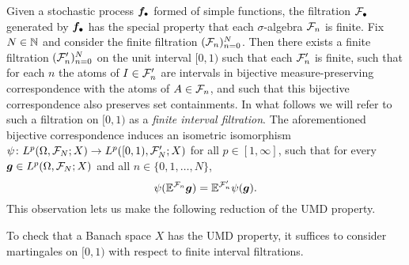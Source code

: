Given a stochastic process $\bm{f}_{\bullet}$ formed of simple functions, the filtration $\mathcal{F}_{\bullet}$ generated by $\bm{f}_{\bullet}$ has the special property that each $\sigma$-algebra $\mathcal{F}_{n}$ is finite.
Fix $N \in \mathbb{N}$ and consider the finite filtration $(\mathcal{F}_{n})_{n=0}^{N}$.
Then there exists a finite filtration $(\mathcal{F}_{n}')_{n=0}^{N}$ on the unit interval $[0,1)$ such that each $\mathcal{F}_{n}'$ is finite, such that for each $n$ the atoms of $I \in \mathcal{F}_{n}'$ are intervals in bijective measure-preserving correspondence with the atoms of $A \in \mathcal{F}_{n}$, and such that this bijective correspondence also preserves set containments.
In what follows we will refer to such a filtration on $[0,1)$ as a \emph{finite interval filtration}.
The aforementioned bijective correspondence induces an isometric isomorphism $\psi \colon L^p(\Omega,\mathcal{F}_{N};X) \to L^p([0,1),\mathcal{F}_{N}';X)$ for all $p \in [1,\infty]$, such that for every $\bm{g} \in L^p(\Omega, \mathcal{F}_{N};X)$ and all $n \in \{0,1,\ldots,N\}$,
\begin{equation*}
  \psi(\mathbb{E}^{\mathcal{F}_{n}} \bm{g}) = \mathbb{E}^{\mathcal{F}_{n}'} \psi(\bm{g}). 
\end{equation*}
This observation lets us make the following reduction of the UMD property.

\begin{prop}\label{prop:UMD-FIF}
  To check that a Banach space $X$ has the UMD property, it suffices to consider martingales on $[0,1)$ with respect to finite interval filtrations.
\end{prop}

